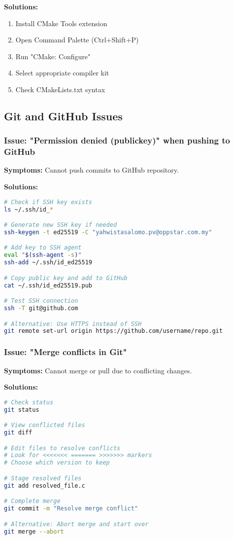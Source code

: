 \documentclass[11pt,a4paper]{article}
\begin{document}
\textbf{Solutions:}
\begin{enumerate}
    \item Install CMake Tools extension
    \item Open Command Palette (Ctrl+Shift+P)
    \item Run "CMake: Configure"
    \item Select appropriate compiler kit
    \item Check CMakeLists.txt syntax
\end{enumerate}

\subsection{Git and GitHub Issues}

\subsubsection{Issue: "Permission denied (publickey)" when pushing to GitHub}
\textbf{Symptoms:} Cannot push commits to GitHub repository.

\textbf{Solutions:}
\begin{lstlisting}[language=bash]
# Check if SSH key exists
ls ~/.ssh/id_*

# Generate new SSH key if needed
ssh-keygen -t ed25519 -C "yahwistasalomo.pv@oppstar.com.my"

# Add key to SSH agent
eval "$(ssh-agent -s)"
ssh-add ~/.ssh/id_ed25519

# Copy public key and add to GitHub
cat ~/.ssh/id_ed25519.pub

# Test SSH connection
ssh -T git@github.com

# Alternative: Use HTTPS instead of SSH
git remote set-url origin https://github.com/username/repo.git
\end{lstlisting}

\subsubsection{Issue: "Merge conflicts in Git"}
\textbf{Symptoms:} Cannot merge or pull due to conflicting changes.

\textbf{Solutions:}
\begin{lstlisting}[language=bash]
# Check status
git status

# View conflicted files
git diff

# Edit files to resolve conflicts
# Look for <<<<<<< ======= >>>>>>> markers
# Choose which version to keep

# Stage resolved files
git add resolved_file.c

# Complete merge
git commit -m "Resolve merge conflict"

# Alternative: Abort merge and start over
git merge --abort
\end{lstlisting}
\end{document}
